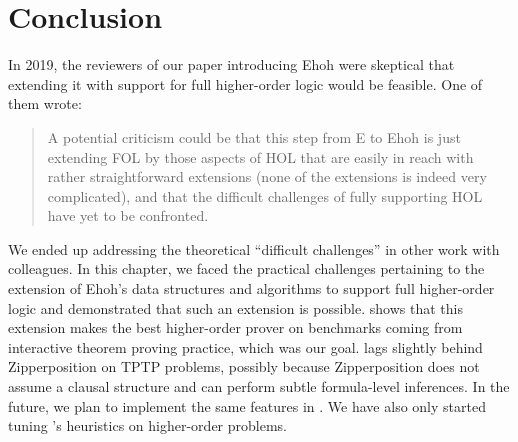   \section{Conclusion} %
  \label{sec:ehoh2:conclusion}
  
  In 2019, the reviewers of our paper introducing Ehoh \cite{vbss-19-ehoh1} were
  skeptical that extending it with support for full higher-order logic would be
  feasible. One of them wrote:
  \begin{quote}
  A potential criticism could be that this step from E to Ehoh is just extending
  FOL by those aspects of HOL that are easily in reach with rather straightforward
  extensions (none of the extensions is indeed very complicated), and that the
  difficult challenges of fully supporting HOL have yet to be confronted.
  \end{quote}
  We ended up addressing the theoretical ``difficult challenges'' in other work
  with colleagues. In this chapter, we faced the practical challenges pertaining to the extension
  of Ehoh's data structures and algorithms to support full higher-order logic and
  demonstrated that such an extension is possible.  shows
  that this extension makes \ehohii{} the best higher-order prover on
  benchmarks coming from interactive theorem proving practice, which was our goal. \ehohii{}
  lags slightly behind Zipperposition on TPTP problems, possibly because Zipperposition
  does not assume a clausal structure and can perform subtle formula-level
  inferences. In the future, we plan to implement the same features in \ehohii{}.
  We have also only started tuning \ehohii{}'s heuristics on higher-order
  problems.
